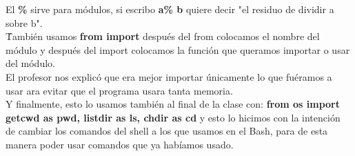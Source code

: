 \documentclass{article}
\begin{document}
	El \textbf{\%} sirve para módulos, si escribo \textbf{a\% b} quiere decir "el residuo de dividir a sobre b". \\  \'
	También usamos \textbf{from     import     } después del from colocamos el nombre del módulo y después del import colocamos la función que queramos importar o usar del módulo. \\
	El profesor nos explicó que era mejor importar únicamente lo que fuéramos a usar ara evitar que el programa usara tanta memoria. \\
	Y finalmente, esto lo usamos también al final de la clase con: \textbf{from os import getcwd as pwd, listdir as ls, chdir as cd} y esto lo hicimos con la intención de cambiar los comandos del shell a los que usamos en el Bash, para de esta manera poder usar comandos que ya habíamos usado.\\
\end{document}
